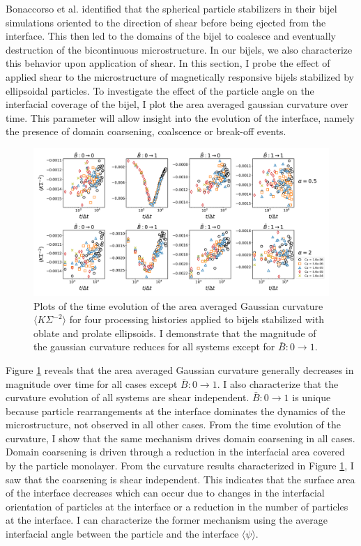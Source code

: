 Bonaccorso et al. identified that the spherical particle stabilizers in their bijel simulations oriented to the direction of shear before being
ejected from the interface. \cite{bonaccorso_shear_2020} This then led to the domains of the bijel to coalesce and eventually destruction of the
bicontinuous microstructure. \cite{bonaccorso_shear_2020} In our bijels, we also characterize this behavior upon application of shear.
In this section, I probe the effect of applied shear to the microstructure of magnetically
responsive bijels stabilized by ellipsoidal particles. To investigate the effect of the particle angle on the interfacial coverage of the bijel,
I plot the area averaged gaussian curvature over time. This parameter will allow insight into the evolution of the interface, namely the presence of
domain coarsening, coalscence or break-off events.

\begin{figure} 
    \centering 
    \includegraphics[scale=0.3]{../figures/results/paper3/gaussian-time_compare.png} 
    \caption{Plots of the time evolution of the area averaged Gaussian curvature $\langle K \Sigma^{-2} \rangle$ for four 
             processing histories applied to bijels stabilized with oblate and prolate ellipsoids. I demonstrate that the 
             magnitude of the gaussian curvature reduces for all systems except for $\bar{B}: 0 \to 1$.} 
    \label{fig:gaussian_curvature_time_shear} 
\end{figure}

Figure \ref{fig:gaussian_curvature_time_shear} reveals that the area averaged Gaussian curvature generally decreases in magnitude over time for all cases except 
$\bar{B}: 0 \to 1$. I also characterize that the curvature evolution of all systems are shear independent. $\bar{B}: 0 \to 1$ is
unique because particle rearrangements at the interface dominates the dynamics of the microstructure, not observed in all other
cases. From the time evolution of the curvature, I show that the same mechanism drives domain coarsening in all cases. Domain
coarsening is driven through a reduction in the interfacial area covered by the particle monolayer. From the curvature results characterized in 
Figure \ref{fig:gaussian_curvature_time_shear}, I saw that the coarsening is shear independent. This indicates that the surface area of the interface 
decreases which can occur due to changes in the interfacial orientation of particles at the interface or a reduction in the number of particles at the interface. 
I can characterize the former mechanism using the average interfacial angle between the particle and the interface $\langle \psi \rangle$.


